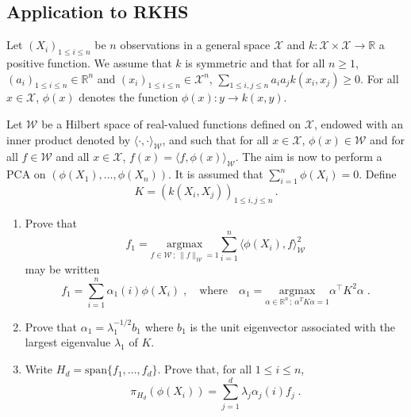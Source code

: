 \documentclass[a4paper,10pt,fleqn]{article}
\newcommand{\eqsp}{\,}
\newcommand{\rset}{\ensuremath{\mathbb{R}}}
\newcommand{\W}{\ensuremath{\mathcal{W}}}
\newcommand{\X}{\ensuremath{\mathcal{X}}}
\newcommand{\1}{\ensuremath{\mathbbm{1}}}
\newcommand{\bfK}{K}
\begin{document}
\subsection*{Application to RKHS}
Let $(X_i)_{1\le i \le n}$ be $n$ observations in a general space $\X$ and $k: \X\times \X \to \rset$ a positive function. We assume that $k$ is symmetric and that for all $n\geqslant 1$, $(a_i)_{1\leqslant i \leqslant n}\in\rset^n$ and $(x_i)_{1\leqslant i \leqslant n}\in\X^n$, $\sum_{1\leqslant i,j \leqslant n}a_ia_j k(x_i,x_j)\geqslant 0$.  For all $x\in\X$, $\phi(x)$ denotes the function $\phi(x): y\to k(x,y)$.

Let $\W$ be a Hilbert space of real-valued functions defined on $\X$, endowed with an inner product denoted by $\langle \cdot,\cdot \rangle_{\W}$, and such that for all $x\in\X$, $\phi(x)\in\W$ and for all $f\in \W$ and all $x\in\X$, $f(x) = \langle f,\phi(x) \rangle_{\W}$. The aim is now to perform a PCA on $(\phi(X_1),\ldots,\phi(X_n))$. It is assumed that $\sum_{i=1}^n \phi(X_i) = 0$. Define
$$
\bfK = \left(k(X_i,X_j)\right)_{1\leqslant i,j \leqslant n}\eqsp.
$$
\begin{enumerate}
\item Prove that
$$
f_1 =  \underset{f\in \W\,;\,\|f\|_\W=1}{\mathrm{argmax}} \sum_{i=1}^n\langle \phi(X_i),f\rangle_\W^2
$$
may be written
$$
f_1 = \sum_{i=1}^n \alpha_1(i) \phi(X_i)\;,\quad\mbox{where}\quad \alpha_1 =  \underset{\alpha\in \rset^n\,;\, \alpha^T \bfK\alpha=1}{\mathrm{argmax}}\alpha^\top\bfK^2\alpha\;.
$$
\item Prove that $\alpha_1 = \lambda_1^{-1/2}b_1$ where $b_1$ is the unit eigenvector associated with the largest eigenvalue $\lambda_1$ of $\bfK$.
\item Write $H_d = \mathrm{span}\{f_1,\ldots,f_d\}$. Prove that, for all $1\leqslant i\leqslant n$,
$$
\pi_{H_d}(\phi(X_i)) = \sum_{j=1}^d \lambda_{j}\alpha_j(i)f_j\;.
$$
\end{enumerate}
\end{document}
